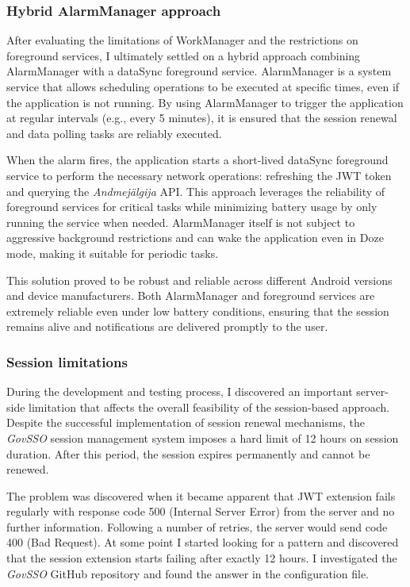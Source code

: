 \subsubsection{Hybrid AlarmManager approach}
\label{alarmmanager-approach}
After evaluating the limitations of WorkManager and the restrictions on foreground services, I ultimately settled on a hybrid approach combining AlarmManager with a dataSync foreground service. AlarmManager is a system service that allows scheduling operations to be executed at specific times, even if the application is not running. By using AlarmManager to trigger the application at regular intervals (e.g., every 5 minutes), it is ensured that the session renewal and data polling tasks are reliably executed.

When the alarm fires, the application starts a short-lived dataSync foreground service to perform the necessary network operations: refreshing the JWT token and querying the \textit{Andmejälgija} API. This approach leverages the reliability of foreground services for critical tasks while minimizing battery usage by only running the service when needed. AlarmManager itself is not subject to aggressive background restrictions and can wake the application even in Doze mode, making it suitable for periodic tasks.

This solution proved to be robust and reliable across different Android versions and device manufacturers. Both AlarmManager and foreground services are extremely reliable even under low battery conditions, ensuring that the session remains alive and notifications are delivered promptly to the user.

\subsubsection{Session limitations}
\label{session-limitations}
During the development and testing process, I discovered an important server-side limitation that affects the overall feasibility of the session-based approach. Despite the successful implementation of session renewal mechanisms, the \textit{GovSSO} session management system imposes a hard limit of 12 hours on session duration. After this period, the session expires permanently and cannot be renewed.

The problem was discovered when it became apparent that JWT extension fails regularly with response code 500 (Internal Server Error) from the server and no further information. Following a number of retries, the server would send code 400 (Bad Request). At some point I started looking for a pattern and discovered that the session extension starts failing after exactly 12 hours. I investigated the \textit{GovSSO} GitHub repository \cite{govsso-session} and found the answer in the configuration file.


